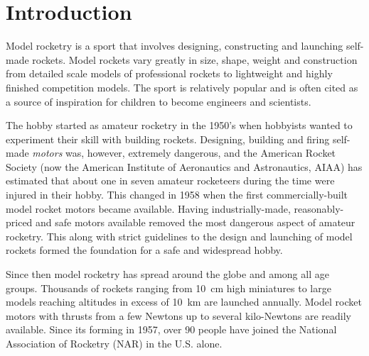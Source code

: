 
\chapter{Introduction}

Model rocketry is a sport that involves designing, constructing and
launching self-made rockets.  Model rockets vary greatly in size,
shape, weight and construction from detailed scale models of
professional rockets to lightweight and highly finished competition
models.  The sport is relatively popular and is often cited as a
source of inspiration for children to become engineers and
scientists.

The hobby started as amateur rocketry in the 1950's when hobbyists
wanted to experiment their skill with building rockets.  Designing,
building and firing self-made {\it motors} was, however, extremely dangerous,
and the American Rocket Society (now the American Institute of
Aeronautics and Astronautics, AIAA) has estimated that about one in seven
amateur rocketeers during the time were injured in their hobby.  This
changed in 1958 when the first commercially-built model rocket
motors became available.  Having industrially-made, reasonably-priced
and safe motors available removed the most dangerous aspect of amateur
rocketry.  This along with strict guidelines to the design and
launching of model rockets formed the foundation for a safe and
widespread hobby.~\cite[pp.~1--3]{stine}

Since then model rocketry has spread around the globe and among all
age groups.  Thousands of rockets ranging from 10~cm high miniatures
to large models reaching altitudes in excess of 10~km are launched
annually.  Model rocket motors with thrusts from a few Newtons up to
several kilo-Newtons are readily available.  Since its forming in
1957, over 90 people have joined the National Association of
Rocketry (NAR) in the U.S. alone.

